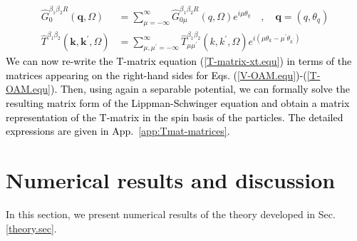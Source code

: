 \documentclass[aps,prb,superscriptaddress,letterpaper,amsmath,amssymb,twocolumn,preprintnumbers]{revtex4}
\newcommand\revisionB[1]{\textcolor{black}{#1}}
\begin{document}
\begin{align}\label{G-OAM.equ}
\hat{G}^{\beta_1 \beta_2 R}_0 (\mathbf{q},\Omega) &= \sum_{\mu = -\infty}^{\infty} \hat{G}^{\beta_1 \beta_2 R}_{0 \mu} (q,\Omega) e^{i \mu \theta_q} \quad , \quad \mathbf{q} = (q,\theta_q) \\
\label{T-OAM.equ}
\hat{T}^{\beta_1 \beta_2} (\mathbf{k},\mathbf{k}^{\prime},\Omega) &= \sum_{\mu , \mu^{\prime} = -\infty}^{\infty} \hat{T}^{\beta_1 \beta_2}_{\mu \mu^{\prime}} (k,k^{\prime}, \Omega) e^{i (\mu \theta_k - \mu^{\prime} \theta_{k^{\prime}})}
\end{align}
\revisionB{
We can now re-write the T-matrix equation (\ref{T-matrix-xt.equ}) in terms of the matrices appearing on the right-hand sides for
 Eqs. (\ref{V-OAM.equ})-(\ref{T-OAM.equ}). Then, using again a separable potential, we can formally solve the resulting matrix form of the Lippman-Schwinger equation and obtain a matrix representation of the T-matrix in the spin basis of the particles. The detailed expressions are given in
  App.\ \ref{app:Tmat-matrices}.
}






















\section{Numerical results and discussion}

\label{sec:results}

In this section, we present numerical results of the theory developed in Sec. \ref{theory.sec}.
\end{document}

